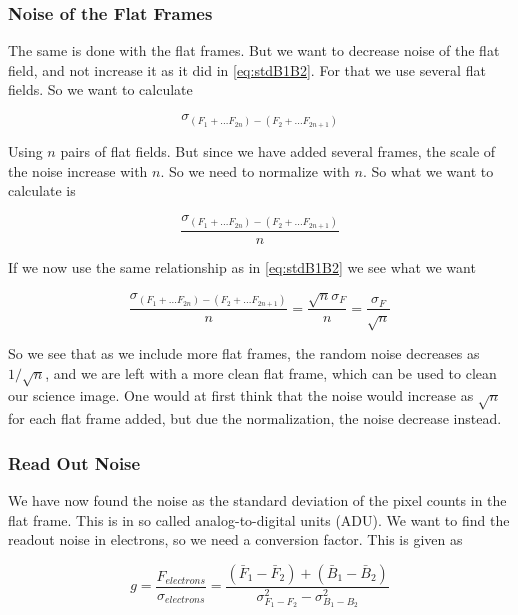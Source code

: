 \documentclass{emulateapj}
\begin{document}
\subsubsection{Noise of the Flat Frames}
\label{sec:noiseFlat}
The same is done with the flat frames. But we want to decrease noise of the flat field, and not increase it as it did in \eqref{eq:stdB1B2}. For that we use several flat fields. So we want to calculate

\begin{equation}
\sigma_{(F_1 + \ldots F_{2n})- (F_2 + \ldots F_{2n+1})}
\end{equation}

Using $n$ pairs of flat fields. But since we have added several frames, the scale of the noise increase with $n$. So we need to normalize with $n$. So what we want to calculate is

\begin{equation}
\frac{\sigma_{(F_1 + \ldots F_{2n})- (F_2 + \ldots F_{2n+1})}}{n}
\end{equation}

If we now use the same relationship as in \eqref{eq:stdB1B2} we see what we want

\begin{equation}
\frac{\sigma_{(F_1 + \ldots F_{2n})- (F_2 + \ldots F_{2n+1})}}{n} = \frac{\sqrt{n}\sigma_F}{n} = \frac{\sigma_F}{\sqrt{n}}
\end{equation}

So we see that as we include more flat frames, the random noise decreases as $1/\sqrt{n}$, and we are left with a more clean flat frame, which can be used to clean our science image. One would at first think that the noise would increase as $\sqrt{n}$ for each flat frame added, but due the normalization, the noise decrease instead.

\subsubsection{Read Out Noise}

We have now found the noise as the standard deviation of the pixel counts in the flat frame. This is in so called analog-to-digital units (ADU). We want to find the readout noise in electrons, so we need a conversion factor. This is given as

\begin{equation}
g = \frac{F_{electrons}}{\sigma_{electrons}} = \frac{(\bar{F}_1 - \bar{F}_2) + (\bar{B}_1-\bar{B}_2)}{\sigma_{F_1 - F_2}^2 - \sigma_{B_1 - B_2}^2}
\label{eq:g}
\end{equation}
\end{document}
